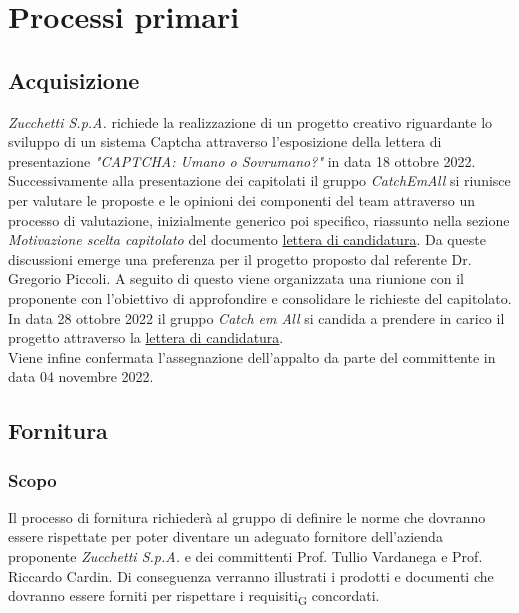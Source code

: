 \section{Processi primari}
\subsection{Acquisizione}
\textit{Zucchetti S.p.A.} richiede la realizzazione di un progetto creativo riguardante lo sviluppo di un sistema Captcha attraverso l'esposizione della lettera di presentazione \textit{"CAPTCHA: Umano o Sovrumano?"} in data 18 ottobre 2022.\\
Successivamente alla presentazione dei capitolati il gruppo \textit{CatchEmAll} si riunisce per valutare le proposte e le opinioni dei componenti del team attraverso un processo di valutazione, inizialmente generico poi specifico, riassunto nella sezione \textit{Motivazione scelta capitolato} del documento \href{https://github.com/catchEmAll-SWE/catchEmAll-Docs/blob/main/Assegnazione appalti/LetteraCandidatura.pdf}{lettera di candidatura}. Da queste discussioni emerge una preferenza per il progetto proposto dal referente Dr. Gregorio Piccoli. 
A seguito di questo viene organizzata una riunione con il proponente con l'obiettivo di approfondire e consolidare le richieste del capitolato. \\ 
In data 28 ottobre 2022 il gruppo \textit{Catch em All} si candida a prendere in carico il progetto attraverso la \href{https://github.com/catchEmAll-SWE/catchEmAll-Docs/blob/main/Assegnazione appalti/LetteraCandidatura.pdf}{lettera di candidatura}.\\
Viene infine confermata l'assegnazione dell'appalto da parte del committente in data 04 novembre 2022.


\subsection{Fornitura}
\subsubsection{Scopo}
Il processo di fornitura richiederà al gruppo di definire le norme che dovranno essere rispettate per poter diventare un adeguato fornitore dell'azienda proponente \textit{Zucchetti S.p.A.} e dei committenti Prof. Tullio Vardanega e Prof. Riccardo Cardin. Di conseguenza verranno illustrati i prodotti e documenti che dovranno essere forniti per rispettare i requisiti\textsubscript{G} concordati.
